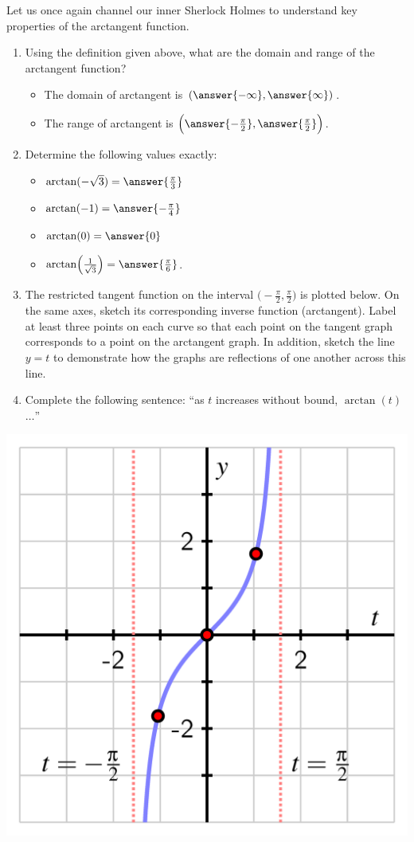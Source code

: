 \documentclass{ximera}
\begin{document}
\begin{problem}
Let us once again channel our inner Sherlock Holmes to understand key properties of the arctangent function.%
\par
\begin{enumerate}
\item Using the definition given above, what are the domain and range of the arctangent function?
%
\begin{itemize}
\item The domain of arctangent is $(\answer{-\infty} , \answer{\infty})$.
%
\item The range of arctangent is $\Big(\answer{-\frac{\pi}{2}} , \answer{\frac{\pi}{2}} \Big)$.
\end{itemize}
%
\item Determine the following values exactly: 
\begin{itemize}
\item $\arctan(-\sqrt{3}) = \answer{\frac{\pi}{3}}$
%
\item $\arctan(-1) = \answer{-\frac{\pi}{4}}$
%
\item $\arctan(0) = \answer{0}$
%
\item $\arctan\!\Big(\frac{1}{\sqrt{3}}\Big) = \answer{\frac{\pi}{6}}$.
\end{itemize}
%
\item The restricted tangent function on the interval $\Big(\!-\frac{\pi}{2}, \frac{\pi}{2}\Big)$ is plotted below. On the same axes, sketch its corresponding inverse function (arctangent).  Label at least three points on each curve so that each point on the tangent graph corresponds to a point on the arctangent graph. In addition, sketch the line $y = t$ to demonstrate how the graphs are reflections of one another across this line.%
%
\item Complete the following sentence:  ``as $t$ increases without bound, $\arctan(t)$ $\ldots$'' %
\end{enumerate}
\includegraphics[width=.8\linewidth]{inverse-tan-graph.png}
\end{problem}
\end{document}
